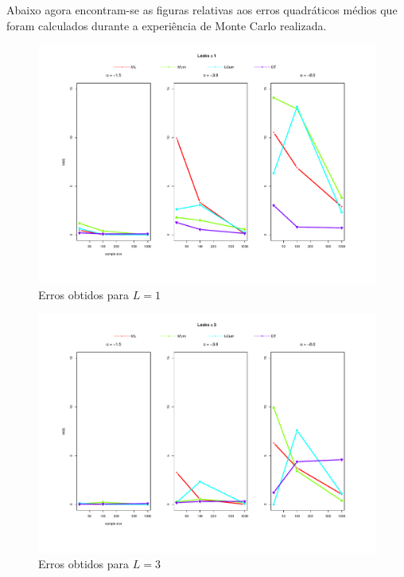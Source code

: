 Abaixo agora encontram-se as figuras relativas aos erros quadráticos médios que foram calculados durante a experiência de Monte Carlo realizada. 
\begin{figure}[H]
     \centering
     \includegraphics[scale=0.5]{plots/mse_L=1.pdf}
     \caption{Erros obtidos para $L=1$}
     \label{graf_12}
\end{figure}
\begin{figure}[H]
     \centering
     \includegraphics[scale=0.5]{plots/mse_L=3.pdf}
     \caption{Erros obtidos para $L=3$}
     \label{graf_13}
\end{figure}
